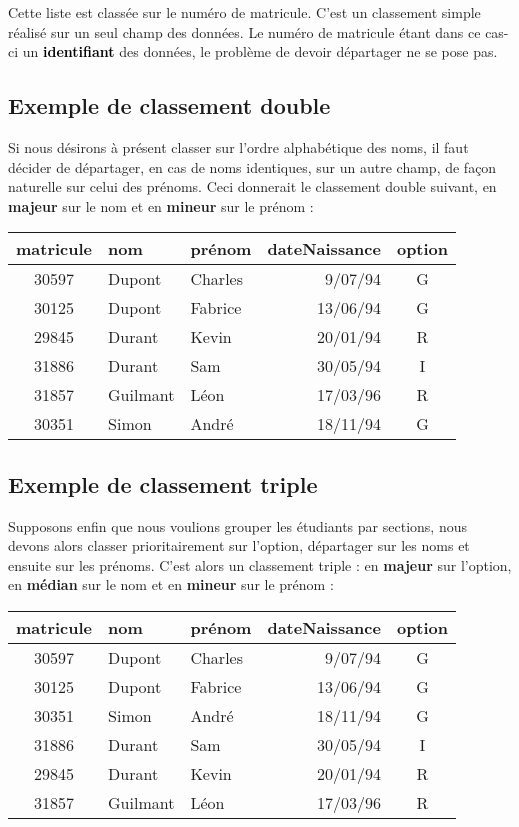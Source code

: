 	Cette liste est classée sur le numéro de matricule. C’est un classement
	simple réalisé sur un seul champ des données. Le numéro de matricule
	étant dans ce cas-ci un \textbf{\textcolor{black}{identifiant}} des
	données, le problème de devoir départager ne se pose pas.

\subsection*{Exemple de classement double}

	Si nous désirons à présent classer sur l’ordre alphabétique des noms, il
	faut décider de départager, en cas de noms identiques, sur un autre
	champ, de façon naturelle sur celui des prénoms. Ceci donnerait le
	classement double suivant, en \textbf{majeur} sur le nom et en
	\textbf{mineur} sur le prénom :
	
	\begin{center}
	\small\sffamily
	\begin{tabular}{cllrc}
		matricule 	& nom 		& prénom 	& dateNaissance & option \\
		\hline 
		30597 		& Dupont 	& Charles 	& 9/07/94 		& G\\
		30125 		& Dupont	& Fabrice 	& 13/06/94 		& G\\
		29845     	& Durant 	& Kevin 	& 20/01/94 		& R\\
		31886 		& Durant  	& Sam 		& 30/05/94 		& I\\
		31857 		& Guilmant  & Léon 		& 17/03/96 		& R\\
		30351 		& Simon 	& André 	& 18/11/94 		& G\\
		\hline 
	\end{tabular}
	\end{center}
	
\subsection*{Exemple de classement triple}

	Supposons enfin que nous voulions grouper les étudiants par sections,
	nous devons alors classer prioritairement sur l’option, départager sur
	les noms et ensuite sur les prénoms. C’est alors un classement triple :
	en \textbf{majeur} sur l’option, en \textbf{médian} sur le nom et en
	\textbf{mineur} sur le prénom : 

	\begin{center}
	\small\sffamily
	\begin{tabular}{cllrc}
		matricule 	& nom 		& prénom 	& dateNaissance & option \\
		\hline 
		30597 		& Dupont 	& Charles 	& 9/07/94 		& G\\
		30125 		& Dupont	& Fabrice 	& 13/06/94 		& G\\
		30351 		& Simon 	& André 	& 18/11/94 		& G\\
		31886 		& Durant  	& Sam 		& 30/05/94 		& I\\
		29845     	& Durant 	& Kevin 	& 20/01/94 		& R\\
		31857 		& Guilmant  & Léon 		& 17/03/96 		& R\\
		\hline 
	\end{tabular}
	\end{center}

